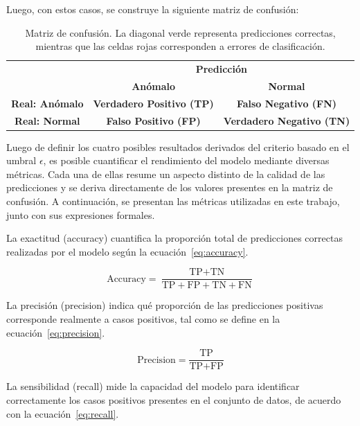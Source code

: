 \documentclass[a4paper,10pt]{book}
\begin{document}
Luego, con estos casos, se construye la siguiente matriz de confusión:

\begin{table}[H]
	\centering
	\renewcommand{\arraystretch}{1.8}
	\begin{tabular}{c|c|c|}
		\multicolumn{1}{c}{} &
		\multicolumn{2}{c}{\textbf{Predicción}} \\
		\multicolumn{1}{c}{} &
		\textbf{Anómalo} & \textbf{Normal} \\ \hline
		\textbf{Real: Anómalo} &
		\cellcolor{green!25}\textbf{Verdadero Positivo (TP)} &
		\cellcolor{red!25}\textbf{Falso Negativo (FN)} \\ \hline
		\textbf{Real: Normal} &
		\cellcolor{red!25}\textbf{Falso Positivo (FP)} &
		\cellcolor{green!25}\textbf{Verdadero Negativo (TN)} \\ \hline
	\end{tabular}
	\caption{Matriz de confusión. La diagonal verde representa predicciones correctas, mientras que las celdas rojas corresponden a errores de clasificación.}
\end{table}

Luego de definir los cuatro posibles resultados derivados del criterio basado en el umbral $\epsilon$, es posible cuantificar el rendimiento del modelo mediante diversas métricas. Cada una de ellas resume un aspecto distinto de la calidad de las predicciones y se deriva directamente de los valores presentes en la matriz de confusión. A continuación, se presentan las métricas utilizadas en este trabajo, junto con sus expresiones formales.

La exactitud (accuracy) cuantifica la proporción total de predicciones correctas realizadas por el modelo según la ecuación~\ref{eq:accuracy}.

\begin{equation}
	\text{Accuracy} =
	\frac{\text{TP} + \text{TN}}
	{\text{TP} + \text{FP} + \text{TN} + \text{FN}}
	\label{eq:accuracy}
\end{equation}

La precisión (precision) indica qué proporción de las predicciones positivas corresponde realmente a casos positivos, tal como se define en la ecuación~\ref{eq:precision}.

\begin{equation}
	\text{Precision} =
	\frac{\text{TP}}
	{\text{TP} + \text{FP}}
	\label{eq:precision}
\end{equation}

La sensibilidad (recall) mide la capacidad del modelo para identificar correctamente los casos positivos presentes en el conjunto de datos, de acuerdo con la ecuación~\ref{eq:recall}.
\end{document}
